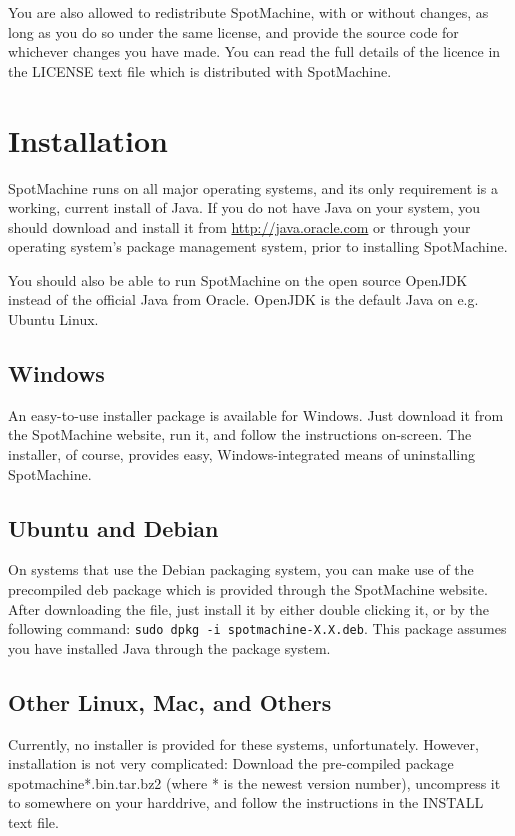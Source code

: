 \documentclass[a4paper,12pt]{report}
\begin{document}
You are also allowed to redistribute SpotMachine, with or without changes, as
long as you do so under the same license, and provide the source code for
whichever changes you have made. You can read the full details of the licence in
the LICENSE text file which is distributed with SpotMachine.

\chapter{Installation}
SpotMachine runs on all major operating systems, and its only requirement is a
working, current install of Java. If you do not have Java on your system, you
should download and install it from \url{http://java.oracle.com} or through your
operating system's package management system, prior to installing SpotMachine.

You should also be able to run SpotMachine on the open source  OpenJDK instead
of the official Java from Oracle. OpenJDK is the default Java on e.g. Ubuntu Linux.

\section{Windows}
An easy-to-use installer package is available for Windows. Just download it from
the SpotMachine website, run it, and follow the instructions on-screen. The
installer, of course, provides easy, Windows-integrated means of uninstalling
SpotMachine.

\section{Ubuntu and Debian}
On systems that use the Debian packaging system, you can make use of the
precompiled deb package which is provided through the SpotMachine website. After
downloading the file, just install it by either double clicking it, or by the
following command: \texttt{sudo dpkg -i spotmachine-X.X.deb}. This package
assumes you have installed Java through the package system.

\section{Other Linux, Mac, and Others}
Currently, no installer is provided for these systems, unfortunately. However,
installation is not very complicated: Download the pre-compiled package
spotmachine*.bin.tar.bz2 (where * is the newest version number), uncompress it
to somewhere on your harddrive, and follow the instructions in the INSTALL text
file.
\end{document}
